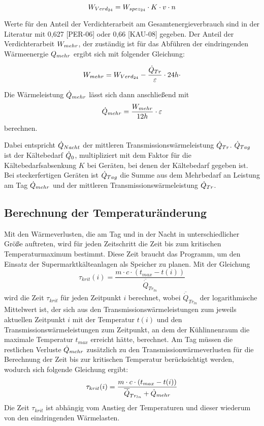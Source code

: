 \begin{equation}
	\lverd = \lspez \cdot K \cdot v \cdot n
\label{lverd}
\end{equation}

Werte für den Anteil der Verdichterarbeit am Gesamtenergieverbrauch sind in der Literatur mit 0,627 [PER-06] oder 0,66
[KAU-08] gegeben.  Der Anteil der Verdichterarbeit ${W}_{mehr}$, der zuständig ist für das Abführen der eindringenden Wärmeenergie
$Q_{mehr}$ ergibt sich mit folgender Gleichung:

\begin{equation}
	\lmehr = \lverd - \frac{\ptrans}{\epsilon} \cdot 24h \cdot
\label{lmehr}
\end{equation}

Die Wärmeleistung $\dot{Q}_{mehr}$ lässt sich dann anschließend mit
\begin{equation}
	\pmehr = \frac{\lmehr}{12h} \cdot \epsilon
\label{<++>}
\end{equation}
berechnen.

Dabei entspricht $\dot{Q}_{Nacht}$ der mittleren Transmissionswärmeleistung $\dot{Q}_{Tr}$. $\dot{Q}_{Tag}$ ist der Kältebedarf $\dot{Q}_{0}$,
multipliziert mit dem Faktor für die Kältebedarfsabsenkung $K$ bei Geräten, bei denen der Kältebedarf gegeben ist. Bei
steckerfertigen Geräten ist $\dot{Q}_{Tag}$ die Summe aus dem Mehrbedarf an Leistung am Tag $\dot{Q}_{mehr}$ und der mittleren
Transmissionswärmeleistung $\dot{Q}_{Tr}$.

\subsection{Berechnung der Temperaturänderung}
Mit den Wärmeverlusten, die am Tag und in der Nacht in unterschiedlicher Größe auftreten, wird für jeden Zeitschritt die Zeit
bis zum kritischen Temperaturmaximum bestimmt. Diese Zeit braucht das Programm, um den Einsatz der Supermarktkälteanlagen als
Speicher zu planen. Mit der Gleichung
\begin{equation}
	\tau_{krit}(i) = \frac{m \cdot c \cdot (t_{max} - t(i))}{\overline{\dot{Q}}_{Tr_{ln}}}
\label{taukn}
\end{equation}
wird die Zeit $\tau_{krit}$ für jeden Zeitpunkt $i$ berechnet, wobei $\overline{\dot{Q}}_{Tr_{ln}}$ der logarithmische Mittelwert
ist, der sich aus den Transmissionswärmeleistungen zum jeweils aktuellen Zeitpunkt $i$ mit der Temperatur $t(i)$ und den
Transmissionswärmeleistungen zum Zeitpunkt, an dem der Kühlinnenraum die maximale Temperatur $t_{max}$ erreicht hätte,
berechnet. Am Tag müssen die restlichen Verluste $\dot{Q}_{mehr}$ zusätzlich zu den Transmissionwärmeverlusten für die Berechnung der
Zeit bis zur kritischen Temperatur berücksichtigt werden, wodurch sich folgende Gleichung ergibt:
\begin{equation}
	\tau_{krit}(i) = \frac{m \cdot c \cdot (t_{max} - t(i))}{{\overline{\dot{Q}}_{Tr_{ln}}} + \pmehr}
\label{taukd}
\end{equation}
Die Zeit $\tau_{krit}$ ist abhängig vom Anstieg der Temperaturen und dieser wiederum von den eindringenden Wärmelasten.

